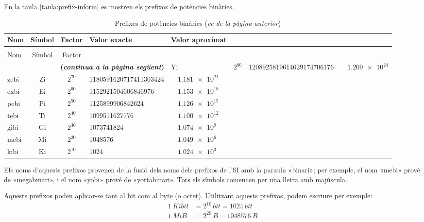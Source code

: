En la taula \vref{taula:prefix-inform} es mostren els prefixos de potències binàries.
\begin{longtable}[h]{lccll}
   \caption{\label{taula:prefix-inform} Prefixos de potències binàries}\\
   \toprule[1pt]
    Nom & Símbol  & Factor & Valor exacte & Valor aproximat\\
   \midrule
   \endfirsthead
   \caption[]{Prefixes de potències binàries (\emph{ve de la pàgina anterior})}\\
   \toprule[1pt]
    Nom & Símbol  & Factor \\
   \midrule
   \endhead
   \midrule
   \multicolumn{4}{r}{\sffamily\bfseries\color{NavyBlue}(\emph{continua a la pàgina següent})}
   \endfoot
   \endlastfoot
   yobi & Yi   & $2^{80}$ & \num{1208925819614629174706176} &  $\quad\num{1,209e24}$ \\
   zebi & Zi   & $2^{70}$ & \num{1180591620717411303424}&  $\quad\num{1,181e21}$ \\
   exbi & Ei   & $2^{60}$ & \num{1152921504606846976}&  $\quad\num{1,153e18}$ \\
   pebi & Pi   & $2^{50}$ & \num{1125899906842624}&  $\quad\num{1,126e15}$ \\
   tebi & Ti   & $2^{40}$ & \num{1099511627776}&  $\quad\num{1,100e12}$ \\
   gibi & Gi   & $2^{30}$ & \num{1073741824}&  $\quad\num{1,074e9}$  \\
   mebi & Mi   & $2^{20}$ & \num{1048576} &  $\quad\num{1,049e6}$ \\
   kibi & Ki   & $2^{10}$ & \num{1024} & $\quad\num{1,024e3}$  \\
   \bottomrule[1pt]
\end{longtable}
        
   


Els noms d'aquests prefixos provenen de la fusió dels noms dels prefixos de l'SI amb la paraula «binari»; per exemple, el nom «mebi» prové de «megabinari», i el nom «yobi» prové de «yottabinari». Tots els símbols comencen per una lletra amb majúscula. 

Aquests prefixos poden aplicar-se tant al bit com al byte (o octet). Utilitzant aquests prefixos, podem escriure per exemple:
\begin{align*}
	\qty{1}{Kibit} &= 2^{10}\unit{\,bit} = \qty{1024}{bit} \\
	\qty{1}{MiB} &= 2^{20}\unit{\,B} = \qty{1048576}{B}
\end{align*}


